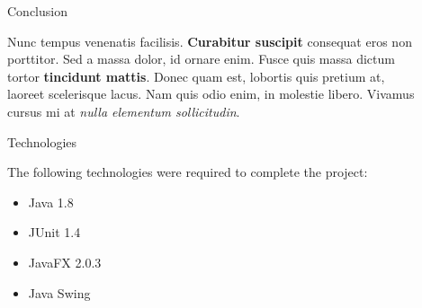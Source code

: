 \documentclass[final]{beamer}
\newlength{\sepwid}
\newlength{\onecolwid}
\newlength{\twocolwid}
\begin{document}
\begin{frame}[t]
\begin{columns}[t]
\begin{column}{\twocolwid}
\begin{columns}[t,totalwidth=\twocolwid]
\begin{column}{\twocolwid}
\end{column} %

\end{columns} %

\end{column} %

\begin{column}{\sepwid}\end{column} %

\begin{column}{\onecolwid} %


\begin{block}{Conclusion}

Nunc tempus venenatis facilisis. \textbf{Curabitur suscipit} consequat eros non porttitor. Sed a massa dolor, id ornare enim. Fusce quis massa dictum tortor \textbf{tincidunt mattis}. Donec quam est, lobortis quis pretium at, laoreet scelerisque lacus. Nam quis odio enim, in molestie libero. Vivamus cursus mi at \textit{nulla elementum sollicitudin}.

\end{block}


\begin{block}{Technologies}

The following technologies were required to complete the project:

\begin{itemize}
\item Java 1.8
\item JUnit 1.4
\item JavaFX 2.0.3
\item Java Swing
\end{itemize}

\end{block}



\end{column}
\end{columns}
\end{frame}
\end{document}
